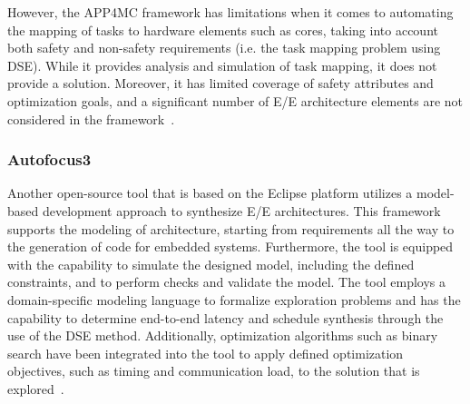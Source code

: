 However, the APP4MC framework has limitations when it comes to automating the mapping of tasks to hardware elements such as cores, taking into account both safety and non-safety requirements (i.e. the task mapping problem using DSE). While it provides analysis and simulation of task mapping, it does not provide a solution. Moreover, it has limited coverage of safety attributes and optimization goals, and a significant number of E/E architecture elements are not considered in the framework~\cite{askaripoor2022architecture}.



\subsubsection{Autofocus3}
Another open-source tool that is based on the Eclipse platform utilizes a model-based development approach to synthesize E/E architectures. This framework supports the modeling of architecture, starting from requirements all the way to the generation of code for embedded systems. Furthermore, the tool is equipped with the capability to simulate the designed model, including the defined constraints, and to perform checks and validate the model.
The tool employs a domain-specific modeling language to formalize exploration problems and has the capability to determine end-to-end latency and schedule synthesis through the use of the DSE method. Additionally, optimization algorithms such as binary search have been integrated into the tool to apply defined optimization objectives, such as timing and communication load, to the solution that is explored~\cite{aravantinos2015autofocus,voss2014design,holzl200713}.


